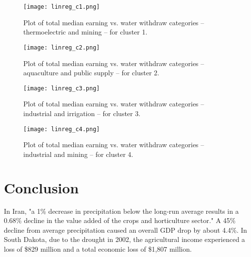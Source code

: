 \documentclass{article}
\begin{document}
\begin{figure}[hbt!]
    \centering
    \texttt{[image: linreg\_c1.png]}
    \caption{Plot of total median earning vs. water withdraw categories -- thermoelectric and mining -- for cluster 1.}
    \label{fig:my_label}
\end{figure}



\begin{figure}[hbt!]
    \centering
    \texttt{[image: linreg\_c2.png]}
    \caption{Plot of total median earning vs. water withdraw categories -- aquaculture and public supply -- for cluster 2.}
    \label{fig:my_label}
\end{figure}



\begin{figure}[hbt!]
    \centering
    \texttt{[image: linreg\_c3.png]}
    \caption{Plot of total median earning vs. water withdraw categories -- industrial and irrigation -- for cluster 3.}
    \label{fig:my_label}
\end{figure}




\begin{figure}[hbt!]
    \centering
    \texttt{[image: linreg\_c4.png]}
    \caption{Plot of total median earning vs. water withdraw categories -- industrial and mining -- for cluster 4.}
    \label{fig:my_label}
\end{figure}

\clearpage
\section{Conclusion}
In Iran, "a 1\% decrease in precipitation below the long-run average results in a 0.68\% decline in the value added of the crops and horticulture sector." A 45\% decline from average precipitation caused an overall GDP drop by about 4.4\%. \cite{Salami:2008} In South Dakota, due to the drought in 2002, the agricultural income experienced a loss of \$829 million and a total economic loss of \$1,807 million. \cite{Diersen:2002}




\clearpage





\end{document}
